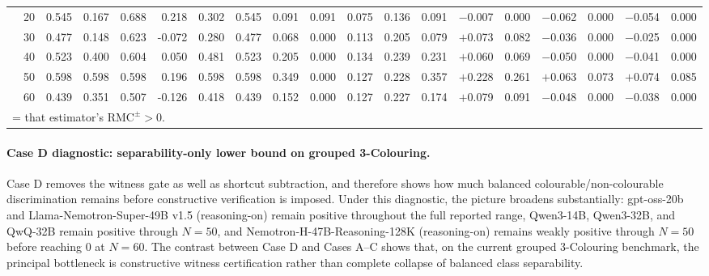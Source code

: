 \documentclass[conference]{IEEEtran}
\theoremstyle{remark}
\newcommand{\RMC}{\mathrm{RMC}}
\begin{document}
\begin{table}[ht]
{\begin{tabular}{p{1.55cm}r rrrr rr rr rr r rr rr rr}
  & 20 & 0.545 & 0.167 & 0.688 & 0.218 & 0.302 & 0.545 & 0.091 & 0.091 & 0.075 & 0.136 & 0.091 & $-$0.007 & 0.000 & $-$0.062 & 0.000 & $-$0.054 & 0.000 \\
  & 30 & 0.477 & 0.148 & 0.623 & -0.072 & 0.280 & 0.477 & 0.068 & 0.000 & 0.113 & 0.205 & 0.079 & \cellcolor{green!15}$+$0.073 & \cellcolor{green!15}0.082 & $-$0.036 & 0.000 & $-$0.025 & 0.000 \\
  & 40 & 0.523 & 0.400 & 0.604 & 0.050 & 0.481 & 0.523 & 0.205 & 0.000 & 0.134 & 0.239 & 0.231 & \cellcolor{green!15}$+$0.060 & \cellcolor{green!15}0.069 & $-$0.050 & 0.000 & $-$0.041 & 0.000 \\
  & 50 & 0.598 & 0.598 & 0.598 & 0.196 & 0.598 & 0.598 & 0.349 & 0.000 & 0.127 & 0.228 & 0.357 & \cellcolor{green!15}$+$0.228 & \cellcolor{green!15}0.261 & \cellcolor{green!15}$+$0.063 & \cellcolor{green!15}0.073 & \cellcolor{green!15}$+$0.074 & \cellcolor{green!15}0.085 \\
  & 60 & 0.439 & 0.351 & 0.507 & -0.126 & 0.418 & 0.439 & 0.152 & 0.000 & 0.127 & 0.227 & 0.174 & \cellcolor{green!15}$+$0.079 & \cellcolor{green!15}0.091 & $-$0.048 & 0.000 & $-$0.038 & 0.000 \\
\bottomrule
\multicolumn{19}{l}{\colorbox{green!15}{\phantom{X}} = that estimator's $\RMC^{\pm}>0$.}
\end{tabular}%
}
\end{table}

\paragraph{Case D diagnostic: separability-only lower bound on grouped 3-Colouring.}
Case D removes the witness gate as well as shortcut subtraction, and therefore shows how much balanced colourable/non-colourable discrimination remains before constructive verification is imposed.
Under this diagnostic, the picture broadens substantially: gpt-oss-20b and Llama-Nemotron-Super-49B v1.5 (reasoning-on) remain positive throughout the full reported range, Qwen3-14B, Qwen3-32B, and QwQ-32B remain positive through $N=50$, and Nemotron-H-47B-Reasoning-128K (reasoning-on) remains weakly positive through $N=50$ before reaching $0$ at $N=60$.
The contrast between Case D and Cases A--C shows that, on the current grouped 3-Colouring benchmark, the principal bottleneck is constructive witness certification rather than complete collapse of balanced class separability.
\end{document}
